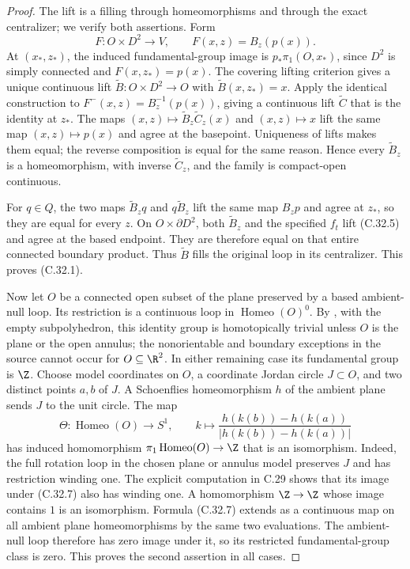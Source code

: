 \begin{proof}
The lift is a filling through homeomorphisms and through the exact
centralizer; we verify both assertions. Form
\[
 F:O\times D^2\longrightarrow V,\qquad
                       F(x,z)=B_z(p(x)).                 \tag{C.32.6}
\]
At $(x_*,z_*)$, the induced fundamental-group image is
$p_*\pi_1(O,x_*)$, since $D^2$ is simply connected and
$F(x,z_*)=p(x)$. The covering lifting criterion gives a unique
continuous lift $\widetilde B:O\times D^2\to O$ with
$\widetilde B(x,z_*)=x$.
Apply the identical construction to
$F^-(x,z)=B_z^{-1}(p(x))$, giving a continuous lift
$\widetilde C$ that is the identity at $z_*$.
The maps
$(x,z)\mapsto\widetilde B_z\widetilde C_z(x)$ and
$(x,z)\mapsto x$ lift the same map $(x,z)\mapsto p(x)$
and agree at the basepoint. Uniqueness of lifts makes them equal;
the reverse composition is equal for the same reason.
Hence every $\widetilde B_z$ is a homeomorphism, with inverse
$\widetilde C_z$, and the family is compact-open continuous.

For $q\in Q$, the two maps
$\widetilde B_z q$ and $q\widetilde B_z$ lift the same map
$B_zp$ and agree at $z_*$, so they are equal for every $z$.
On $O\times\partial D^2$, both $\widetilde B_z$ and the specified
$f_t$ lift (C.32.5) and agree at the based endpoint. They are
therefore equal on that entire connected boundary product.
Thus $\widetilde B$ fills the original loop in its centralizer.
This proves (C.32.1).

Now let $O$ be a connected open subset of the plane preserved by
a based ambient-null loop. Its restriction is a continuous loop
in $\operatorname{Homeo}(O)^0$. By
\cite[Theorem~1.1]{C_Yagasaki2000}, with the empty subpolyhedron,
this identity group is homotopically trivial unless $O$ is the
plane or the open annulus; the nonorientable and boundary
exceptions in the source cannot occur for $O\subseteq\R^2$.
In either remaining case its fundamental group is $\Z$.
Choose model coordinates on $O$, a coordinate Jordan circle
$J\subset O$, and two distinct points $a,b$ of $J$. A Schoenflies
homeomorphism $h$ of the ambient plane sends $J$ to the unit circle.
The map
\[
 \Theta:\operatorname{Homeo}(O)\longrightarrow S^1,\qquad
 k\longmapsto
       \frac{h(k(b))-h(k(a))}
            {|h(k(b))-h(k(a))|}
                                                        \tag{C.32.7}
\]
has induced homomorphism $\pi_1\operatorname{Homeo}(O)\to\Z$
that is an isomorphism. Indeed, the full rotation loop in the
chosen plane or annulus model preserves $J$ and has restriction
winding one. The explicit computation in C.29 shows that its
image under (C.32.7) also has winding one. A homomorphism
$\Z\to\Z$ whose image contains $1$ is an isomorphism.
Formula (C.32.7) extends as a continuous map on all ambient
plane homeomorphisms by the same two evaluations. The
ambient-null loop therefore has zero image under it, so its
restricted fundamental-group class is zero. This proves the
second assertion in all cases.


\end{proof}
